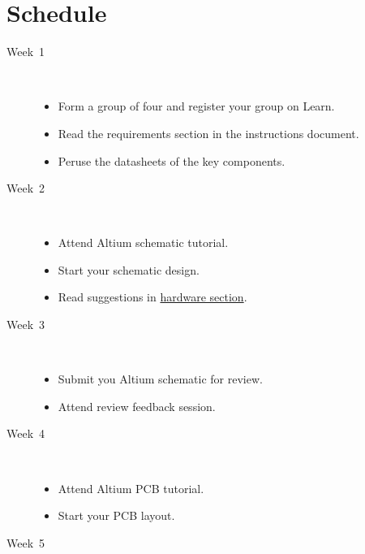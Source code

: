 \chapter{Schedule}

\begin{description}
\item [Week~1]\mbox{}\\

  \begin{itemize}
  \item Form a group of four and register your group on Learn.
  \item Read the requirements section in the instructions document.
  \item Peruse the datasheets of the key components.
  \end{itemize}
  
\item [Week~2]\mbox{}\\
  
  \begin{itemize}
  \item Attend Altium schematic tutorial.
  \item Start your schematic design.
  \item Read suggestions in \hyperref[hardware]{hardware section}.
  \end{itemize}
  
\item [Week~3]\mbox{}\\
  
  \begin{itemize}
  \item Submit you Altium schematic for review.
  \item Attend review feedback session.
  \end{itemize}
  
\item [Week~4]\mbox{}\\
  
  \begin{itemize}
  \item Attend Altium PCB tutorial.
  \item Start your PCB layout.
  \end{itemize}
  
  
\item [Week~5]\mbox{}\\
  

\end{description}
